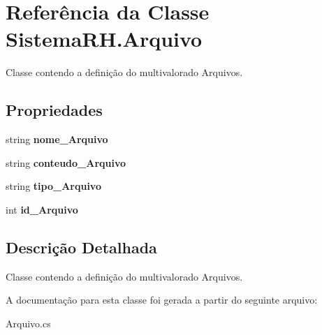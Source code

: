 \hypertarget{class_sistema_r_h_1_1_arquivo}{
\section{Referência da Classe SistemaRH.Arquivo}
\label{class_sistema_r_h_1_1_arquivo}
}


Classe contendo a definição do multivalorado Arquivos.  


\subsection*{Propriedades}
\begin{DoxyCompactItemize}
\item 
\hypertarget{class_sistema_r_h_1_1_arquivo_a3528daea84e1618553c68a8f459983d5}{
string {\bfseries nome\_\-Arquivo}}
\label{class_sistema_r_h_1_1_arquivo_a3528daea84e1618553c68a8f459983d5}

\item 
\hypertarget{class_sistema_r_h_1_1_arquivo_a81739b185c5bc97e8e9d7bc483311be4}{
string {\bfseries conteudo\_\-Arquivo}}
\label{class_sistema_r_h_1_1_arquivo_a81739b185c5bc97e8e9d7bc483311be4}

\item 
\hypertarget{class_sistema_r_h_1_1_arquivo_a401a59b97457289972d4c00d019680f2}{
string {\bfseries tipo\_\-Arquivo}}
\label{class_sistema_r_h_1_1_arquivo_a401a59b97457289972d4c00d019680f2}

\item 
\hypertarget{class_sistema_r_h_1_1_arquivo_afa819c460e5bc21e6351575a07af5b97}{
int {\bfseries id\_\-Arquivo}}
\label{class_sistema_r_h_1_1_arquivo_afa819c460e5bc21e6351575a07af5b97}

\end{DoxyCompactItemize}


\subsection{Descrição Detalhada}
Classe contendo a definição do multivalorado Arquivos. 

A documentação para esta classe foi gerada a partir do seguinte arquivo:\begin{DoxyCompactItemize}
\item 
Arquivo.cs\end{DoxyCompactItemize}
